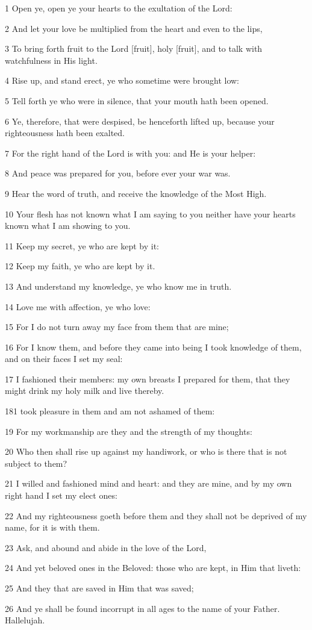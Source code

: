 \par 1 Open ye, open ye your hearts to the exultation of the Lord:
\par 2 And let your love be multiplied from the heart and even to the lips,
\par 3 To bring forth fruit to the Lord [fruit], holy [fruit], and to talk with watchfulness in His light.
\par 4 Rise up, and stand erect, ye who sometime were brought low:
\par 5 Tell forth ye who were in silence, that your mouth hath been opened.
\par 6 Ye, therefore, that were despised, be henceforth lifted up, because your righteousness hath been exalted.
\par 7 For the right hand of the Lord is with you: and He is your helper:
\par 8 And peace was prepared for you, before ever your war was.
\par 9 Hear the word of truth, and receive the knowledge of the Most High.
\par 10 Your flesh has not known what I am saying to you neither have your hearts known what I am showing to you.
\par 11 Keep my secret, ye who are kept by it:
\par 12 Keep my faith, ye who are kept by it.
\par 13 And understand my knowledge, ye who know me in truth.
\par 14 Love me with affection, ye who love:
\par 15 For I do not turn away my face from them that are mine;
\par 16 For I know them, and before they came into being I took knowledge of them, and on their faces I set my seal:
\par 17 I fashioned their members: my own breasts I prepared for them, that they might drink my holy milk and live thereby.
\par 181 took pleasure in them and am not ashamed of them:
\par 19 For my workmanship are they and the strength of my thoughts:
\par 20 Who then shall rise up against my handiwork, or who is there that is not subject to them?
\par 21 I willed and fashioned mind and heart: and they are mine, and by my own right hand I set my elect ones:
\par 22 And my righteousness goeth before them and they shall not be deprived of my name, for it is with them.
\par 23 Ask, and abound and abide in the love of the Lord,
\par 24 And yet beloved ones in the Beloved: those who are kept, in Him that liveth:
\par 25 And they that are saved in Him that was saved;
\par 26 And ye shall be found incorrupt in all ages to the name of your Father. Hallelujah.


